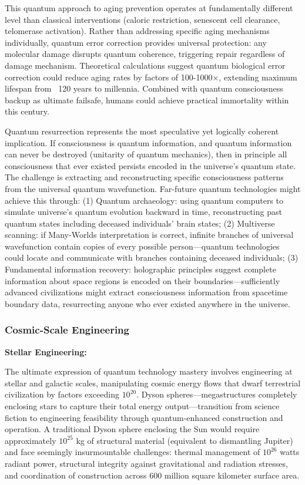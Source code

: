 \documentclass[11pt,a4paper,twoside]{article}
\begin{document}
This quantum approach to aging prevention operates at fundamentally different level than classical interventions (caloric restriction, senescent cell clearance, telomerase activation). Rather than addressing specific aging mechanisms individually, quantum error correction provides universal protection: any molecular damage disrupts quantum coherence, triggering repair regardless of damage mechanism. Theoretical calculations suggest quantum biological error correction could reduce aging rates by factors of 100-1000×, extending maximum lifespan from ~120 years to millennia. Combined with quantum consciousness backup as ultimate failsafe, humans could achieve practical immortality within this century.

Quantum resurrection represents the most speculative yet logically coherent implication. If consciousness is quantum information, and quantum information can never be destroyed (unitarity of quantum mechanics), then in principle all consciousness that ever existed persists encoded in the universe's quantum state. The challenge is extracting and reconstructing specific consciousness patterns from the universal quantum wavefunction. Far-future quantum technologies might achieve this through: (1) Quantum archaeology: using quantum computers to simulate universe's quantum evolution backward in time, reconstructing past quantum states including deceased individuals' brain states; (2) Multiverse scanning: if Many-Worlds interpretation is correct, infinite branches of universal wavefunction contain copies of every possible person---quantum technologies could locate and communicate with branches containing deceased individuals; (3) Fundamental information recovery: holographic principles suggest complete information about space regions is encoded on their boundaries---sufficiently advanced civilizations might extract consciousness information from spacetime boundary data, resurrecting anyone who ever existed anywhere in the universe.

\subsubsection{Cosmic-Scale Engineering}

\textbf{Stellar Engineering:}

The ultimate expression of quantum technology mastery involves engineering at stellar and galactic scales, manipulating cosmic energy flows that dwarf terrestrial civilization by factors exceeding $10^{20}$. Dyson spheres---megastructures completely enclosing stars to capture their total energy output---transition from science fiction to engineering feasibility through quantum-enhanced construction and operation. A traditional Dyson sphere enclosing the Sun would require approximately $10^{25}$ kg of structural material (equivalent to dismantling Jupiter) and face seemingly insurmountable challenges: thermal management of $10^{26}$ watts radiant power, structural integrity against gravitational and radiation stresses, and coordination of construction across 600 million square kilometer surface area.
\end{document}
